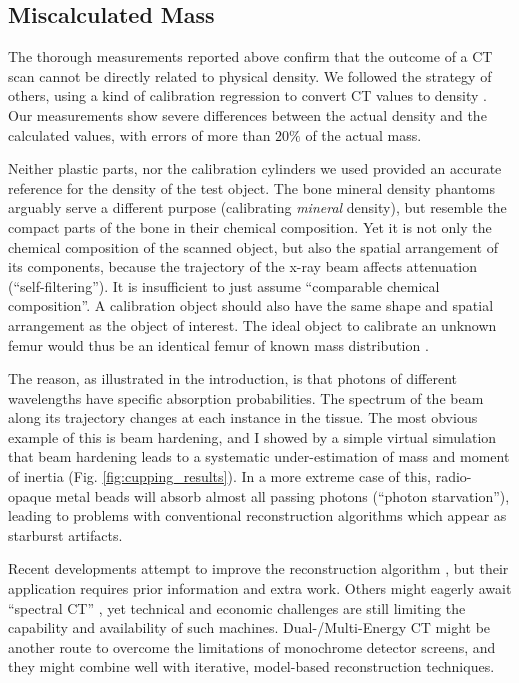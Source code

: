 \subsection{Miscalculated Mass}
\label{sec:org326dc40}
The thorough measurements reported above confirm that the outcome of a CT scan cannot be directly related to physical density.
We followed the strategy of others, using a kind of calibration regression to convert CT values to density \citep{Mull1984,Phillips1997,DuPlessis2013,Durston2022,Fath2023}.
Our measurements show severe differences between the actual density and the calculated values, with errors of more than \(20 \%\) of the actual mass.


Neither plastic parts, nor the calibration cylinders we used provided an accurate reference for the density of the test object.
The bone mineral density phantoms arguably serve a different purpose (calibrating \emph{mineral} density), but resemble the compact parts of the bone in their chemical composition.
Yet it is not only the chemical composition of the scanned object, but also the spatial arrangement of its components, because the trajectory of the x-ray beam affects attenuation (``self-filtering'').
It is insufficient to just assume ``comparable chemical composition''.
A calibration object should also have the same shape and spatial arrangement as the object of interest.
The ideal object to calibrate an unknown femur would thus be an identical femur of known mass distribution \citep[which is actually attempted in clinical tomography, cf.][]{Lennie2021}.


The reason, as illustrated in the introduction, is that photons of different wavelengths have specific absorption probabilities.
The spectrum of the beam along its trajectory changes at each instance in the tissue.
The most obvious example of this is beam hardening, and I showed by a simple virtual simulation that beam hardening leads to a systematic under-estimation of mass and moment of inertia (Fig. \ref{fig:cupping_results}).
In a more extreme case of this, radio-opaque metal beads will absorb almost all passing photons (``photon starvation''), leading to problems with conventional reconstruction algorithms which appear as starburst artifacts.


Recent developments attempt to improve the reconstruction algorithm \citep{Six2019,Frenkel2022,Yang2021,Batenburg2011}, but their application requires prior information and extra work.
Others might eagerly await ``spectral CT'' \citep{Liu2023}, yet technical and economic challenges are still limiting the capability and availability of such machines.
Dual-/Multi-Energy CT might be another route to overcome the limitations of monochrome detector screens, and they might combine well with iterative, model-based reconstruction techniques.


